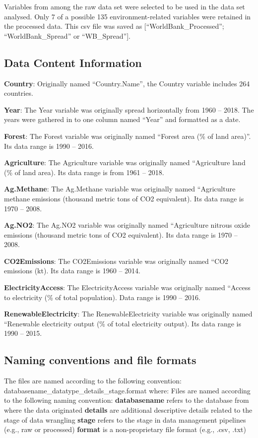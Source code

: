\documentclass[12pt,]{article}
\begin{document}
Variables from among the raw data set were selected to be used in the
data set analysed. Only 7 of a possible 135 environment-related
variables were retained in the processed data. This csv file was saved
as {[}``WorldBank\_Processed''; ``WorldBank\_Spread'' or
``WB\_Spread''{]}.

\subsection{Data Content Information}\label{data-content-information}

\textbf{Country}: Originally named ``Country.Name'', the Country
variable includes 264 countries.

\textbf{Year}: The Year variable was originally spread horizontally from
1960 -- 2018. The years were gathered in to one column named ``Year''
and formatted as a date.

\textbf{Forest}: The Forest variable was originally named ``Forest area
(\% of land area)''. Its data range is 1990 -- 2016.

\textbf{Agriculture}: The Agriculture variable was originally named
``Agriculture land (\% of land area). Its data range is from 1961 --
2018.

\textbf{Ag.Methane}: The Ag.Methane variable was originally named
``Agriculture methane emissions (thousand metric tons of CO2
equivalent). Its data range is 1970 -- 2008.

\textbf{Ag.NO2}: The Ag.NO2 variable was originally named ``Agriculture
nitrous oxide emissions (thousand metric tons of CO2 equivalent). Its
data range is 1970 -- 2008.

\textbf{CO2Emissions}: The CO2Emissions variable was originally named
``CO2 emissions (kt). Its data range is 1960 -- 2014.

\textbf{ElectricityAccess}: The ElectricityAccess variable was
originally named ``Access to electricity (\% of total population). Data
range is 1990 -- 2016.

\textbf{RenewableElectricity}: The RenewableElectricity variable was
originally named ``Renewable electricity output (\% of total electricity
output). Its data range is 1990 -- 2015.

\subsection{Naming conventions and file
formats}\label{naming-conventions-and-file-formats}

The files are named according to the following convention:
databasename\_datatype\_details\_stage.format where: Files are named
according to the following naming convention: \textbf{databasename}
refers to the database from where the data originated \textbf{details}
are additional descriptive details related to the stage of data
wrangling \textbf{stage} refers to the stage in data management
pipelines (e.g., raw or processed) \textbf{format} is a non-proprietary
file format (e.g., .csv, .txt)
\end{document}
